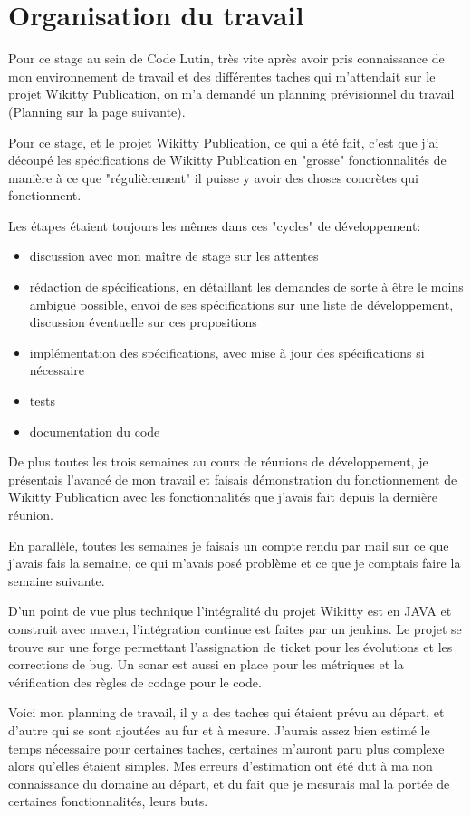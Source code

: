 \section{Organisation du travail}

Pour ce stage au sein de Code Lutin, très vite après avoir pris connaissance 
de mon environnement de travail et des différentes taches qui m'attendait sur
le projet Wikitty Publication, on m'a demandé un planning prévisionnel du travail
(Planning sur la page suivante).

Pour ce stage, et le projet Wikitty Publication, ce qui a été fait, c'est que 
j'ai découpé les spécifications de Wikitty Publication en "grosse" fonctionnalités
de manière à ce que "régulièrement" il puisse y avoir des choses concrètes qui 
fonctionnent.

Les étapes étaient toujours les mêmes dans ces "cycles" de développement:
\begin{itemize}
\item discussion avec mon maître de stage sur les attentes
\item rédaction de spécifications, en détaillant les demandes de sorte à être
le moins ambiguë possible, envoi de ses spécifications sur une liste de 
développement, discussion éventuelle sur ces propositions
\item implémentation des spécifications, avec mise à jour des spécifications 
si nécessaire
\item tests
\item documentation du code
\end{itemize}

De plus toutes les trois semaines au cours de réunions de développement, je 
présentais l'avancé de mon travail et faisais démonstration du fonctionnement
de Wikitty Publication avec les fonctionnalités que j'avais fait depuis la dernière
réunion.

En parallèle, toutes les semaines je faisais un compte rendu par mail sur ce que 
j'avais fais la semaine, ce qui m'avais posé problème et ce que je comptais faire
la semaine suivante. 

D'un point de vue plus technique l'intégralité du projet Wikitty est en JAVA et 
construit avec maven, l'intégration continue est faites par un jenkins. Le projet 
se trouve sur une forge permettant l'assignation de ticket pour les évolutions 
et les corrections de bug. Un sonar est aussi en place pour les métriques et la 
vérification des règles de codage pour le code.

Voici mon planning de travail, il y a des taches qui étaient prévu au départ,
et d'autre qui se sont ajoutées au fur et à mesure. J'aurais assez bien estimé
le temps nécessaire pour certaines taches, certaines m'auront paru plus 
complexe alors qu'elles étaient simples. Mes erreurs d'estimation ont été dut 
à ma non connaissance du domaine au départ, et du fait que je mesurais mal la portée
de certaines fonctionnalités, leurs buts.

 


